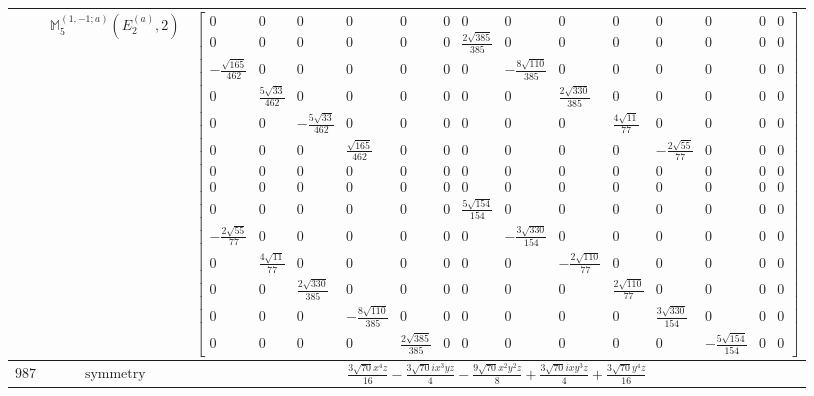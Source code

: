 \documentclass[fleqn,8pt,landscape]{jsarticle}
\begin{document}
\begin{longtable}{ccc}
$  $ & $ \mathbb{M}_{5}^{(1,-1;a)}(E_{2}^{(a)},2) $ & $ \begin{bmatrix} 0 & 0 & 0 & 0 & 0 & 0 & 0 & 0 & 0 & 0 & 0 & 0 & 0 & 0 \\ 0 & 0 & 0 & 0 & 0 & 0 & \frac{2 \sqrt{385}}{385} & 0 & 0 & 0 & 0 & 0 & 0 & 0 \\ - \frac{\sqrt{165}}{462} & 0 & 0 & 0 & 0 & 0 & 0 & - \frac{8 \sqrt{110}}{385} & 0 & 0 & 0 & 0 & 0 & 0 \\ 0 & \frac{5 \sqrt{33}}{462} & 0 & 0 & 0 & 0 & 0 & 0 & \frac{2 \sqrt{330}}{385} & 0 & 0 & 0 & 0 & 0 \\ 0 & 0 & - \frac{5 \sqrt{33}}{462} & 0 & 0 & 0 & 0 & 0 & 0 & \frac{4 \sqrt{11}}{77} & 0 & 0 & 0 & 0 \\ 0 & 0 & 0 & \frac{\sqrt{165}}{462} & 0 & 0 & 0 & 0 & 0 & 0 & - \frac{2 \sqrt{55}}{77} & 0 & 0 & 0 \\ 0 & 0 & 0 & 0 & 0 & 0 & 0 & 0 & 0 & 0 & 0 & 0 & 0 & 0 \\ 0 & 0 & 0 & 0 & 0 & 0 & 0 & 0 & 0 & 0 & 0 & 0 & 0 & 0 \\ 0 & 0 & 0 & 0 & 0 & 0 & \frac{5 \sqrt{154}}{154} & 0 & 0 & 0 & 0 & 0 & 0 & 0 \\ - \frac{2 \sqrt{55}}{77} & 0 & 0 & 0 & 0 & 0 & 0 & - \frac{3 \sqrt{330}}{154} & 0 & 0 & 0 & 0 & 0 & 0 \\ 0 & \frac{4 \sqrt{11}}{77} & 0 & 0 & 0 & 0 & 0 & 0 & - \frac{2 \sqrt{110}}{77} & 0 & 0 & 0 & 0 & 0 \\ 0 & 0 & \frac{2 \sqrt{330}}{385} & 0 & 0 & 0 & 0 & 0 & 0 & \frac{2 \sqrt{110}}{77} & 0 & 0 & 0 & 0 \\ 0 & 0 & 0 & - \frac{8 \sqrt{110}}{385} & 0 & 0 & 0 & 0 & 0 & 0 & \frac{3 \sqrt{330}}{154} & 0 & 0 & 0 \\ 0 & 0 & 0 & 0 & \frac{2 \sqrt{385}}{385} & 0 & 0 & 0 & 0 & 0 & 0 & - \frac{5 \sqrt{154}}{154} & 0 & 0 \end{bmatrix} $ \\ \hline
$ 987 $ & $ \text{symmetry} $ & $ \frac{3 \sqrt{70} x^{4} z}{16} - \frac{3 \sqrt{70} i x^{3} y z}{4} - \frac{9 \sqrt{70} x^{2} y^{2} z}{8} + \frac{3 \sqrt{70} i x y^{3} z}{4} + \frac{3 \sqrt{70} y^{4} z}{16} $ \\

\end{longtable}
\end{document}
